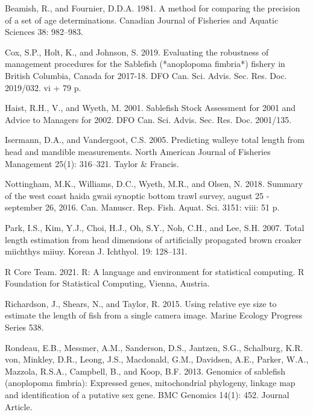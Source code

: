 \documentclass[12pt]{article}\usepackage[]{graphicx}\usepackage[]{color}
\begin{document}
\hypertarget{refs}{}
\begin{CSLReferences}{1}{0}
%
Beamish, R., and Fournier, D.D.A. 1981. A method for comparing the precision of a set of age determinations. Canadian Journal of Fisheries and Aquatic Sciences 38: 982--983.

%
Cox, S.P., Holt, K., and Johnson, S. 2019. Evaluating the robustness of management procedures for the {Sablefish} (*anoplopoma fimbria*) fishery in {British Columbia, Canada} for 2017-18. DFO Can. Sci. Advis. Sec. Res. Doc. 2019/032. vi + 79 p.

%
Haist, R.H., V., and Wyeth, M. 2001. Sablefish {Stock Assessment} for 2001 and {Advice to Managers} for 2002. DFO Can. Sci. Advis. Sec. Res. Doc. 2001/135.

%
Isermann, D.A., and Vandergoot, C.S. 2005. Predicting walleye total length from head and mandible measurements. North American Journal of Fisheries Management 25(1): 316--321. Taylor \& Francis.

%
Nottingham, M.K., Williams, D.C., Wyeth, M.R., and Olsen, N. 2018. Summary of the west coast haida gwaii synoptic bottom trawl survey, august 25 - september 26, 2016. Can. Manuscr. Rep. Fish. Aquat. Sci. 3151: viii: 51 p.

%
Park, I.S., Kim, Y.J., Choi, H.J., Oh, S.Y., Noh, C.H., and Lee, S.H. 2007. Total length estimation from head dimensions of artificially propagated brown croaker miichthys miiuy. Korean J. Ichthyol. 19: 128--131.

%
R Core Team. 2021. R: A language and environment for statistical computing. R Foundation for Statistical Computing, Vienna, Austria.

%
Richardson, J., Shears, N., and Taylor, R. 2015. Using relative eye size to estimate the length of fish from a single camera image. Marine Ecology Progress Series 538.

%
Rondeau, E.B., Messmer, A.M., Sanderson, D.S., Jantzen, S.G., Schalburg, K.R. von, Minkley, D.R., Leong, J.S., Macdonald, G.M., Davidsen, A.E., Parker, W.A., Mazzola, R.S.A., Campbell, B., and Koop, B.F. 2013. Genomics of sablefish (anoplopoma fimbria): Expressed genes, mitochondrial phylogeny, linkage map and identification of a putative sex gene. BMC Genomics 14(1): 452. Journal Article.


\end{CSLReferences}
\end{document}
